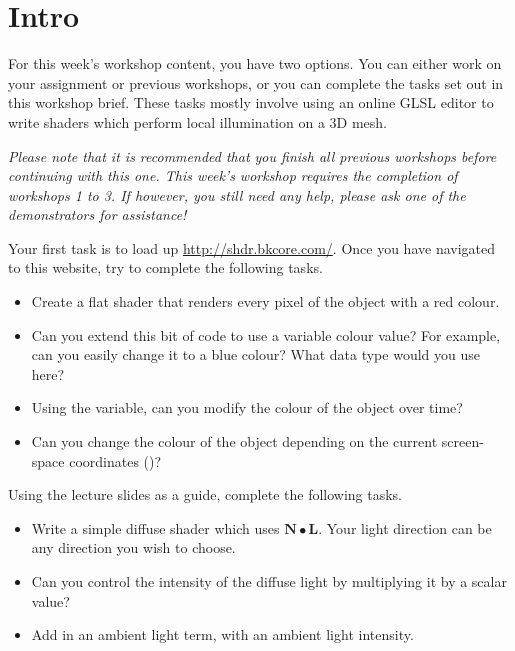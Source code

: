 \documentclass{lincolncslab}
\begin{document}
	\makelabheader
	
	\section*{Intro}
	For this week's workshop content, you have two options. You can either work on your assignment or previous workshops, or you can complete the tasks set out in this workshop brief. These tasks mostly involve using an online GLSL editor to write shaders which perform local illumination on a 3D mesh. 
	
	\centering
	\begin{Sbox}
		\begin{minipage}{0.95\textwidth}
			\emph{Please note that it is recommended that you finish all previous workshops before continuing with this one. This week's workshop requires the completion of workshops 1 to 3. If however, you still need any help, please ask one of the demonstrators for assistance!}
		\end{minipage}
	\end{Sbox}
	\doublebox{\TheSbox}\raggedright
	
	
	\pagebreak
	
	Your first task is to load up \url{http://shdr.bkcore.com/}. Once you have navigated to this website, try to complete the following tasks.
	
	\begin{itemize}
		\item Create a flat shader that renders every pixel of the object with a red colour.
		\item Can you extend this bit of code to use a variable colour value? For example, can you easily change it to a blue colour? What data type would you use here?
		\item Using the  variable, can you modify the colour of the object over time?
		\item Can you change the colour of the object depending on the current screen-space coordinates ()?
	\end{itemize}
	
	Using the lecture slides as a guide, complete the following tasks.
	
	\begin{itemize}
		\item Write a simple diffuse shader which uses $\mathbf{N} \bullet \mathbf{L}$. Your light direction can be any direction you wish to choose.
		\item Can you control the intensity of the diffuse light by multiplying it by a scalar  value?
		\item Add in an ambient light term, with an ambient light intensity.
	\end{itemize}
	
\end{document}
